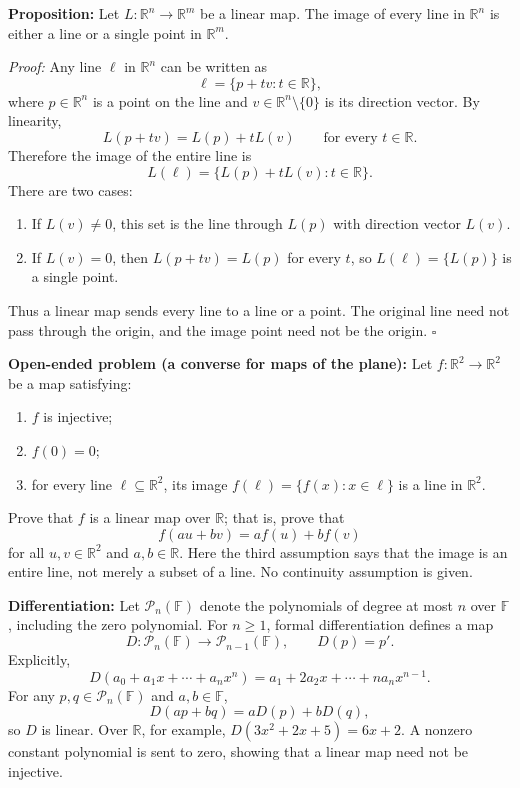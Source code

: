 \documentclass[a4paper,11pt,abstract=true]{scrartcl}
\theoremstyle{dotlessP}
\theoremstyle{dotlessS}
\theoremstyle{remark}
\theoremstyle{definition}
\begin{document}
\begin{problem_box}
\textbf{Proposition:} Let
$L:\mathbb{R}^n\longrightarrow\mathbb{R}^m$ be a linear map. The image of
every line in $\mathbb{R}^n$ is either a line or a single point in
$\mathbb{R}^m$.

\end{problem_box}

\begin{claim_box}
\textit{Proof:} Any line $\ell$ in $\mathbb{R}^n$ can be written as
\[
\ell=\{p+tv:t\in\mathbb{R}\},
\]
where $p\in\mathbb{R}^n$ is a point on the line and
$v\in\mathbb{R}^n\setminus\{0\}$ is its direction vector. By linearity,
\[
L(p+tv)=L(p)+tL(v)
\qquad\text{for every }t\in\mathbb{R}.
\]
Therefore the image of the entire line is
\[
L(\ell)=\{L(p)+tL(v):t\in\mathbb{R}\}.
\]
There are two cases:
\begin{enumerate}
    \item If $L(v)\neq0$, this set is the line through $L(p)$ with
    direction vector $L(v)$.
    \item If $L(v)=0$, then $L(p+tv)=L(p)$ for every $t$, so
    $L(\ell)=\{L(p)\}$ is a single point.
\end{enumerate}
Thus a linear map sends every line to a line or a point. The original line
need not pass through the origin, and the image point need not be the
origin. \hfill$\square$
\end{claim_box}

\begin{problem_box}
\textbf{Open-ended problem (a converse for maps of the plane):} Let
$f:\mathbb{R}^2\longrightarrow\mathbb{R}^2$ be a map satisfying:
\begin{enumerate}
    \item $f$ is injective;
    \item $f(0)=0$;
    \item for every line $\ell\subseteq\mathbb{R}^2$, its image
    $f(\ell)=\{f(x):x\in\ell\}$ is a line in $\mathbb{R}^2$.
\end{enumerate}
Prove that $f$ is a linear map over $\mathbb{R}$; that is, prove that
\[
f(au+bv)=af(u)+bf(v)
\]
for all $u,v\in\mathbb{R}^2$ and $a,b\in\mathbb{R}$.
Here the third assumption says that the image is an entire line, not merely
a subset of a line. No continuity assumption is given.
\end{problem_box}

\begin{claim_box}
\textbf{Differentiation:} Let $\mathcal{P}_n(\mathbb{F})$
denote the polynomials of degree at most $n$ over $\mathbb{F}$, including
the zero polynomial. For $n\geq1$, formal differentiation defines a map
\[
D:\mathcal{P}_n(\mathbb{F})\longrightarrow\mathcal{P}_{n-1}(\mathbb{F}),
\qquad D(p)=p'.
\]
Explicitly,
\[
D(a_0+a_1x+\cdots+a_n x^n)
=a_1+2a_2x+\cdots+na_n x^{n-1}.
\]
For any $p,q\in\mathcal{P}_n(\mathbb{F})$ and $a,b\in\mathbb{F}$,
\[
D(ap+bq)=aD(p)+bD(q),
\]
so $D$ is linear. Over $\mathbb{R}$, for example,
$D(3x^2+2x+5)=6x+2$. A nonzero constant polynomial is sent to zero,
showing that a linear map need not be injective.
\end{claim_box}
\end{document}
